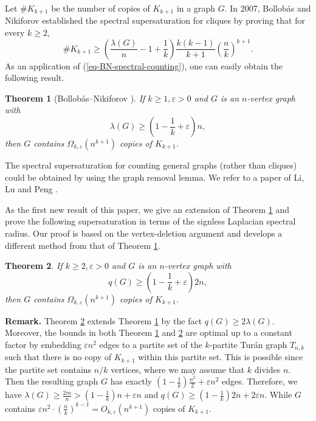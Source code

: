 \documentclass[11pt,a4paper]{article}
\theoremstyle{plain}
\newtheorem{theorem}{Theorem}[section]
\theoremstyle{definition}
\begin{document}
 

Let $\# K_{k+1}$ be the number of copies of $K_{k+1}$ in a graph $G$. 
In 2007, Bollob\'{a}s and Nikiforov \cite{BN2007jctb} established the spectral supersaturation for cliques by proving that for every $k\ge 2$, 
\begin{equation} \label{eq-BN-spectral-counting}
\# K_{k+1} \ge \left( \frac{\lambda (G)}{n}-1+\frac{1}{k}\right)\frac{k(k-1)}{k+1}
\left( \frac{n}{k}\right)^{k+1}. 
\end{equation}
As an application of (\ref{eq-BN-spectral-counting}), one can easily obtain the following result. 


 

\begin{theorem}[Bollob\'{a}s--Nikiforov \cite{BN2007jctb}] \label{thm-BN}
    If $k\ge 1,\varepsilon >0$ and $G$ is an $n$-vertex graph with 
    \[ \lambda (G) 
    \ge \left( 1- \frac{1}{k} + 
    \varepsilon \right)n, \]   
then $G$ contains $\Omega_{k,\varepsilon}  (n^{k+1})$ copies of $K_{k+1}$. 
\end{theorem}

The spectral supersaturation for counting general graphs (rather than cliques) could be obtained by using the graph removal lemma. We refer to a paper of Li, Lu and Peng \cite[Sec. 5]{LLP2024-AAM}. 

 
As the first new result of this paper, we give an extension of Theorem \ref{thm-BN} and prove the following supersaturation in terms of the signless Laplacian spectral radius. 
Our proof is based on the vertex-deletion argument and develops a different method from that of Theorem \ref{thm-BN}. 


\begin{theorem} \label{thm-1-2}
    If $k\ge 2,\varepsilon>0$ and $G$ is an $n$-vertex graph with 
    \[ q(G)\ge \left(1-\frac{1}{k} + \varepsilon \right)2n, \]
    then $G$ contains $\Omega_{k,\varepsilon} (n^{k+1})$ copies of $K_{k+1}$. 
\end{theorem} 
 


\noindent 
{\bf Remark.} 
 Theorem \ref{thm-1-2}
extends Theorem \ref{thm-BN} by the fact $q(G)\ge 2\lambda (G)$. Moreover, 
the bounds in both Theorem \ref{thm-BN} and \ref{thm-1-2} are optimal up to a constant factor by embedding $\varepsilon n^2$ edges to a partite set of the $k$-partite Tur\'{a}n graph $T_{n,k}$ such that there is no copy of $K_{k+1}$ within this partite set. This is possible since the partite set contains $n/k$ vertices, where we may assume that $k$ divides $n$. Then the resulting graph $G$ has exactly $(1- \frac{1}{k})\frac{n^2}{2} + \varepsilon n^2$ edges. Therefore, we have $\lambda (G)\ge \frac{2m}{n} > (1- \frac{1}{k})n + \varepsilon n$ and $q(G)\ge (1- \frac{1}{k})2n + 2\varepsilon n$. While $G$ contains $\varepsilon n^2 \cdot (\frac{n}{k})^{k-1} = O_{k,\varepsilon} (n^{k+1})$ copies of $K_{k+1}$. 
\end{document}
